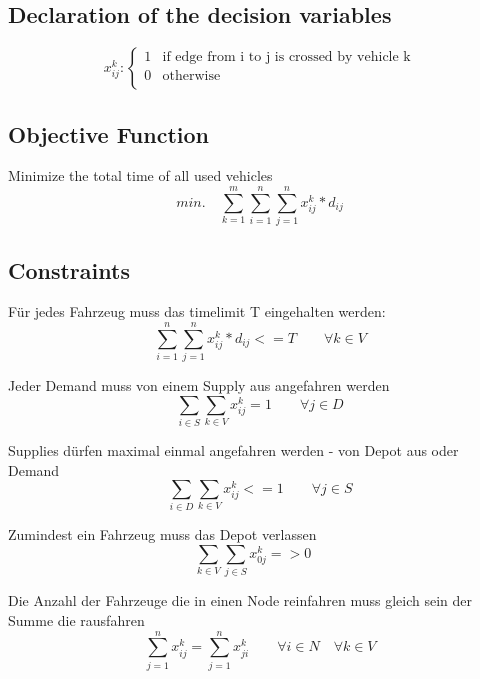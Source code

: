 \documentclass[a4paper]{article}
\begin{document}
\subsection*{Declaration of the decision variables}
\begin{equation*}
x_{ij}^k : 
	\begin{cases}
	1 & \text{if edge from i to j is crossed by vehicle k} \\
	0 & \text{otherwise} \\
	\end{cases}
\end{equation*}

\subsection*{Objective Function}
Minimize the total time of all used vehicles
\begin{equation}
min. \quad \sum_{k=1}^m \sum_{i=1}^n  \sum_{j=1}^n x_{ij}^k * d_{ij}
\end{equation}

\subsection*{Constraints}
Für jedes Fahrzeug muss das timelimit T eingehalten werden:
\begin{equation}
\sum_{i=1}^n  \sum_{j=1}^n x_{ij}^k * d_{ij} <= T		\quad \quad		\forall k \in V 
\end{equation}

Jeder Demand muss von einem Supply aus angefahren werden
\begin{equation}
\sum_{i \in S} \sum_{k \in V} x_{ij}^k = 1		\quad 
\quad		\forall j \in D
\end{equation}

Supplies dürfen maximal einmal angefahren werden - von Depot aus oder Demand
\begin{equation}
\sum_{i \in D} \sum_{k \in V} x_{ij}^k <= 1		\quad 
\quad		\forall j \in S
\end{equation}

Zumindest ein Fahrzeug muss das Depot verlassen
\begin{equation}
\sum_{k \in V} \sum_{j \in S} x_{0j}^k => 0		\quad 
\end{equation}

Die Anzahl der Fahrzeuge die in einen Node reinfahren muss gleich sein der Summe die rausfahren
\begin{equation}
\sum_{j=1}^n x_{ij}^k = \sum_{j=1}^n x_{ji}^k		\quad 
\quad		\forall i \in N 
\quad		\forall k \in V 
\end{equation}
\end{document}
